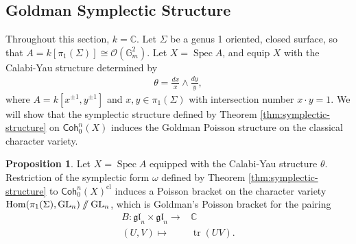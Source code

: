 \documentclass{article}
\numberwithin{equation}{section}
\theoremstyle{quest}
\theoremstyle{definition}
\newtheorem{prop}[thm]{Proposition}
\theoremstyle{remark}
\DeclareMathOperator{\GL}{GL}
\DeclareMathOperator{\Hom}{Hom}
\DeclareMathOperator{\Spec}{Spec}
\DeclareMathOperator{\tr}{tr}
\newcommand{\git}{\mathbin{
  \mathchoice{/\mkern-6mu/}%
    {/\mkern-6mu/}%
    {/\mkern-5mu/}%
    {/\mkern-5mu/}}}%
\begin{document}
\subsection{Goldman Symplectic Structure}
Throughout this section, $k=\mathbb{C} $. Let $\Sigma$ be a genus 1 oriented, closed surface, so that $A=k[\pi_1(\Sigma)]\cong \mathscr{O}(\mathbb{G} _m^2)$. Let $X=\Spec A$, and equip $X$ with the Calabi-Yau structure determined by
\begin{align*}
	\theta=\frac{dx}{x}\wedge \frac{dy}{y},
\end{align*} 
where $A=k[x^{\pm 1},y^{\pm 1}]$ and $x,y\in\pi_1(\Sigma)$ with intersection number $x\cdot y=1$. We will show that the symplectic structure defined by Theorem \ref{thm:symplectic-structure} on $\mathsf{Coh}^n_0(X)$ induces the Goldman Poisson structure on the classical character variety.
\begin{prop}
	Let $X=\Spec A$ equipped with the Calabi-Yau structure $\theta$. Restriction of the symplectic form $\omega$ defined by Theorem \ref{thm:symplectic-structure} to $\mathsf{Coh}^n_0(X)^{\text{cl}}$ induces a Poisson bracket on the character variety $\Hom(\pi_1(\Sigma),\GL_n)\git \GL_n$, which is Goldman's Poisson bracket for the pairing
	\begin{align*}
		B:\mathfrak{gl}_n\times \mathfrak{gl}_n\to &\mathbb{C} \\
		(U,V)\mapsto &\tr(UV).
	\end{align*} 
\end{prop} 
\end{document}
